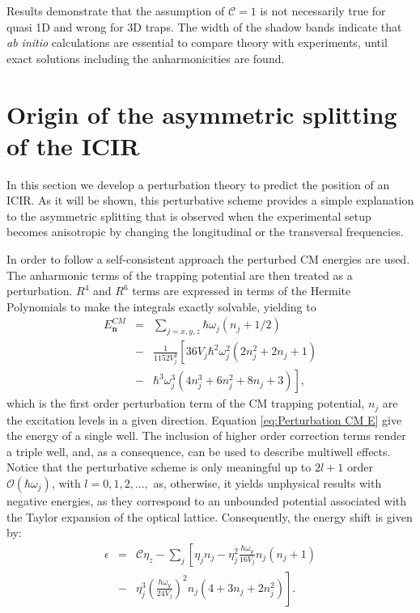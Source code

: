 \documentclass[aps,pre,twocolumn,superscriptaddress,showpacs]{revtex4-1}
\newcommand{\bfeq}[1]{{\boldsymbol{#1}}}
\begin{document}
Results demonstrate that the assumption of $\mathcal{C}=1$ is not necessarily true for quasi 1D and wrong for 3D traps. The width of the shadow bands indicate that \textit{ab initio} calculations are essential to compare theory with experiments, until exact solutions including the anharmonicities are found.
\section{Origin of the asymmetric splitting of the ICIR} \label{sec:perturbation}
In this section we develop a perturbation theory to predict the position of an ICIR. As it will be shown, this perturbative scheme provides a simple explanation to the asymmetric splitting that is observed when the experimental setup becomes anisotropic by changing the longitudinal or the transversal frequencies. 

In order to follow a self-consistent approach the perturbed CM energies are used. The anharmonic terms of the trapping potential are then treated as a perturbation. $R^4$ and $R^6$ terms are expressed in terms of the Hermite Polynomials to make the integrals exactly solvable, yielding to
\begin{eqnarray}
E^{CM}_{\bfeq{n}} &=& \sum_{j=x,y,z} \hbar \omega_j(n_j + 1/2) \nonumber \\ 
&-& \frac{1}{1152V^2_j} \left[ 36V_j\hbar^2\omega^2_j(2n^2_j + 2n_j + 1) \right. \nonumber \\
&-&\left. \hbar^3 \omega^3_j (4n^3_j + 6n^2_j + 8n_j + 3)\right],
\label{eq:Perturbation CM E}
\end{eqnarray}
which is the first order perturbation term of the CM trapping potential, $n_j$ are the excitation levels in a given direction. Equation \eqref{eq:Perturbation CM E} give the energy of a single well. The inclusion of higher order correction terms render a triple well, and, as a consequence, can be used to describe multiwell effects. Notice that the perturbative scheme is only meaningful up to $2l+1$ order $\mathcal{O}(\hbar \omega_j)$, with $l = 0,1,2,...,$ as, otherwise, it yields unphysical results with negative energies, as they correspond to an unbounded potential associated with the Taylor expansion of the optical lattice. Consequently, the energy shift is given by:
\begin{eqnarray}
\epsilon &=& \mathcal{C} \eta_z - \sum_j \left[  \eta_j n_j - \eta^2_j \frac{\hbar \omega_y}{16V_j}n_j(n_j+1) \right. \nonumber \\
 &-&\left. \eta^3_j \left(\frac{\hbar \omega_y}{24V_j}\right)^2 n_j(4 + 3n_j + 2n^2_j)\right].
\label{eq:Perturbation shift}
\end{eqnarray}
\end{document}
